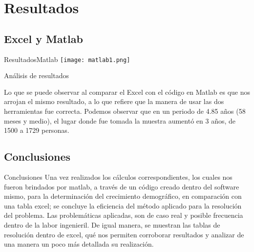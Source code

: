 \documentclass[10pt,xcolor={dvipsnames}]{beamer}
\begin{document}
\section{Resultados}
\subsection{Excel y Matlab}
\begin{frame}{Resultados}{Matlab}
 \texttt{[image: matlab1.png]}
  \item
  \caption {Figura 2. Resultados en Matlab}
  
\end{frame}

\begin{frame}{Análisis de resultados}

 Lo que se puede observar al comparar el Excel con el código en Matlab es que nos arrojan el mismo resultado, a lo que refiere que la manera de usar las dos herramientas fue correcta. Podemos observar que en un periodo de 4.85 años (58 meses y medio), el lugar donde fue tomada la muestra aumentó en 3 años, de 1500 a 1729 personas. 

\end{frame}


\subsection{Conclusiones}
\begin{frame}{Conclusiones}
Una vez realizados los cálculos correspondientes, los cuales  nos fueron brindados por matlab, a través de un código creado dentro del software mismo, para la determinación del crecimiento demográfico, en comparación con una tabla excel; se concluye la eficiencia del método aplicado para la resolución del problema. Las problemáticas aplicadas, son de caso real y posible frecuencia dentro de la labor ingenieril.  De igual manera, se muestran las tablas de resolución dentro de excel, qué nos permiten corroborar resultados y analizar de una manera un poco más detallada su realización.


\end{frame}


{\1
\begin{frame}
\end{frame}}
\end{document}
